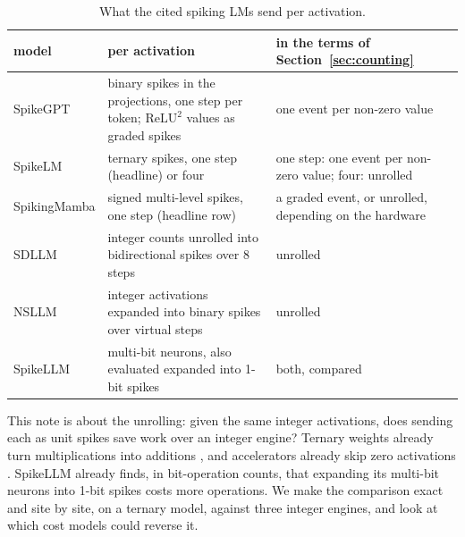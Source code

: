 \documentclass[11pt]{article}
\begin{document}
\begin{table}[t]
\centering\small
\caption{What the cited spiking LMs send per activation.}
\label{tab:encodings}
\begin{tabularx}{\linewidth}{@{}l>{\raggedright\arraybackslash}X>{\raggedright\arraybackslash}X@{}}
\toprule
model & per activation & in the terms of Section~\ref{sec:counting} \\
\midrule
SpikeGPT & binary spikes in the projections, one step per token; $\mathrm{ReLU}^2$ values as
  graded spikes & one event per non-zero value \\
SpikeLM & ternary spikes, one step (headline) or four & one step: one event per non-zero value;
  four: unrolled \\
SpikingMamba & signed multi-level spikes, one step (headline row) & a graded event, or unrolled,
  depending on the hardware \\
SDLLM & integer counts unrolled into bidirectional spikes over 8 steps & unrolled \\
NSLLM \citep{xu2025nsllm} & integer activations expanded into binary spikes over virtual steps
  & unrolled \\
SpikeLLM \citep{xing2025spikellm} & multi-bit neurons, also evaluated expanded into 1-bit spikes
  & both, compared \\
\bottomrule
\end{tabularx}
\end{table}

This note is about the unrolling: given the same integer activations, does sending each as unit
spikes save work over an integer engine? Ternary weights already turn multiplications into
additions \citep{ma2024era}, and accelerators already skip zero activations
\citep{albericio2016cnvlutin,han2016eie,parashar2017scnn}. SpikeLLM already finds, in
bit-operation counts, that expanding its multi-bit neurons into 1-bit spikes costs more
operations. We make the comparison exact and site by site, on a ternary model, against three
integer engines, and look at which cost models could reverse it.
\end{document}
